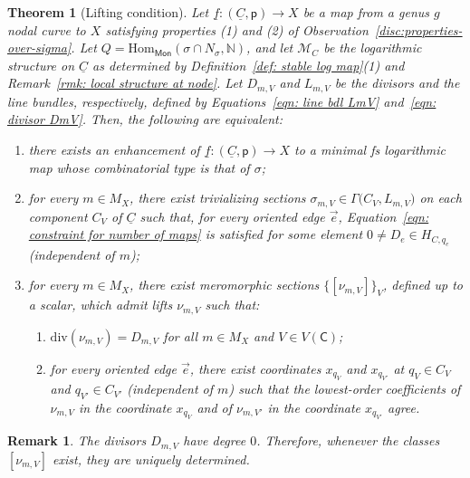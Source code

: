 \documentclass{article}
\def\N{{\mathbb{N}}}
\def\cM{{\overline{\mathcal{M}}}}
\def\cM{{\mathcal{M}}}
\newtheorem{theorem}[definition]{Theorem}
\newtheorem{remark}[definition]{Remark}
\begin{document}
\begin{theorem}[Lifting condition]\label{thm: realizability genus 1} 
Let $\underline{f} \colon (\underline{C}, \mathsf{p}) \to X$ be a map from a genus $g$ nodal curve to $X$ satisfying properties (1) and (2) of Observation~\ref{disc:properties-over-sigma}. Let $Q = \mathrm{Hom}_{\mathsf{Mon}}(\sigma \cap N_\sigma, \N)$, and let $\cM_C$ be the logarithmic structure on $\underline{C}$ as determined by Definition~\ref{def: stable log map}(1) and Remark~\ref{rmk: local structure at node}. Let $D_{m,V}$ and $L_{m,V}$ be the divisors and the line bundles, respectively, defined by Equations~\eqref{eqn: line bdl LmV} and~\eqref{eqn: divisor DmV}. Then, the following are equivalent:
\begin{enumerate}[label=(\arabic*)]
\item there exists an enhancement of $\underline{f} \colon (\underline{C},\mathsf{p}) \to X$ to a minimal fs logarithmic map whose combinatorial type is that of $\sigma$;
\item for every $m \in M_X$, there exist trivializing sections $\sigma_{m,V} \in \Gamma\bigl(C_V, L_{m,V}\bigr)$ on each component $C_V$ of $\underline{C}$ such that, for every oriented edge $\vec{e}$, Equation~\eqref{eqn: constraint for number of maps} is satisfied for some element $0 \neq D_e \in H_{C,q_e}$ (independent of $m$);
\item for every $m \in M_X$, there exist meromorphic sections $\{ [\nu_{m,V}] \}_V$, defined up to a scalar, which admit lifts $\nu_{m,V}$ such that:
\begin{enumerate}
\item $\mathrm{div}(\nu_{m,V}) = D_{m,V}$ for all $m \in M_X$ and $V \in V(\mathsf{C})$;
\item for every oriented edge $\vec{e}$, there exist coordinates $x_{q_V}$ and $x_{q_{V'}}$ at $q_V \in C_V$ and $q_{V'} \in C_{V'}$ (independent of $m$) such that the lowest-order coefficients of $\nu_{m,V}$ in the coordinate $x_{q_V}$ and of $\nu_{m,V'}$ in the coordinate $x_{q_{V'}}$ agree.
\end{enumerate}
\end{enumerate}
\end{theorem}




\begin{remark}
    The divisors $D_{m,V}$ have degree $0$. Therefore, whenever the classes $[\nu_{m,V}]$ exist, they are uniquely determined.
\end{remark}
\end{document}
